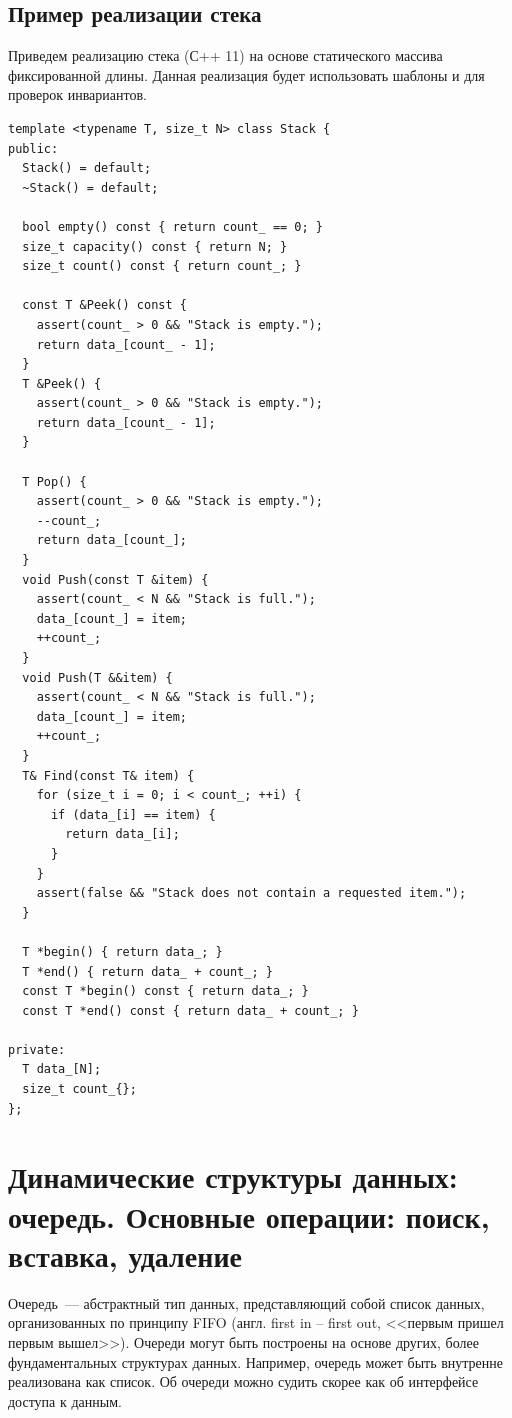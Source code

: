 \subsection{Пример реализации стека}
Приведем реализацию стека (С++ 11) на основе статического массива фиксированной длины. Данная реализация будет использовать шаблоны и
 для проверок инвариантов.

\begin{verbatim}
template <typename T, size_t N> class Stack {
public:
  Stack() = default;
  ~Stack() = default;

  bool empty() const { return count_ == 0; }
  size_t capacity() const { return N; }
  size_t count() const { return count_; }

  const T &Peek() const {
    assert(count_ > 0 && "Stack is empty.");
    return data_[count_ - 1];
  }
  T &Peek() {
    assert(count_ > 0 && "Stack is empty.");
    return data_[count_ - 1];
  }

  T Pop() {
    assert(count_ > 0 && "Stack is empty.");
    --count_;
    return data_[count_];
  }
  void Push(const T &item) {
    assert(count_ < N && "Stack is full.");
    data_[count_] = item;
    ++count_;
  }
  void Push(T &&item) {
    assert(count_ < N && "Stack is full.");
    data_[count_] = item;
    ++count_;
  }
  T& Find(const T& item) {
    for (size_t i = 0; i < count_; ++i) {
      if (data_[i] == item) {
        return data_[i];
      }
    }
    assert(false && "Stack does not contain a requested item.");
  }

  T *begin() { return data_; }
  T *end() { return data_ + count_; }
  const T *begin() const { return data_; }
  const T *end() const { return data_ + count_; }

private:
  T data_[N];
  size_t count_{};
};
\end{verbatim}
\section{Динамические структуры данных: очередь. Основные операции: поиск, вставка, удаление}
Очередь~--- абстрактный тип данных, представляющий собой список данных, организованных по принципу FIFO (англ. first in -- first out, <<первым пришел первым вышел>>).
Очереди могут быть построены на основе других, более фундаментальных структурах данных. Например, очередь может быть внутренне реализована как
список. Об очереди можно судить скорее как об интерфейсе доступа к данным.

